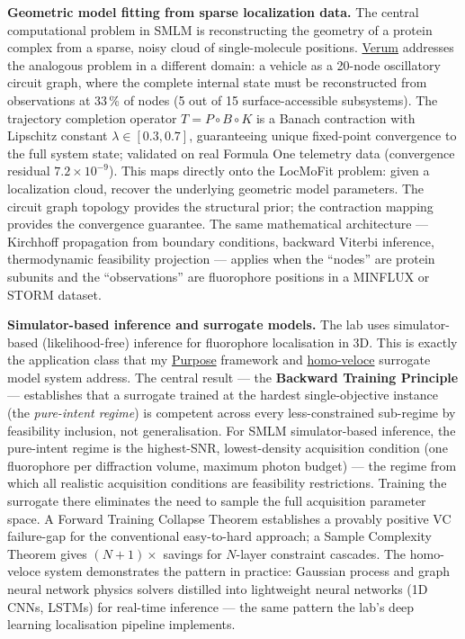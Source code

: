 \documentclass[12pt,a4paper]{article}
\begin{document}
\textbf{Geometric model fitting from sparse localization data.}
The central computational problem in SMLM is reconstructing the geometry of a
protein complex from a sparse, noisy cloud of single-molecule positions.
\href{https://github.com/fullscreen-triangle/verum}{Verum} addresses the analogous
problem in a different domain: a vehicle as a 20-node oscillatory circuit graph,
where the complete internal state must be reconstructed from observations at 33\,\%
of nodes (5 out of 15 surface-accessible subsystems). The trajectory completion
operator $T = P \circ B \circ K$ is a Banach contraction with Lipschitz constant
$\lambda \in [0.3, 0.7]$, guaranteeing unique fixed-point convergence to the full
system state; validated on real Formula One telemetry data (convergence residual
$7.2 \times 10^{-9}$).
This maps directly onto the LocMoFit problem: given a localization cloud, recover
the underlying geometric model parameters. The circuit graph topology provides
the structural prior; the contraction mapping provides the convergence guarantee.
The same mathematical architecture --- Kirchhoff propagation from boundary
conditions, backward Viterbi inference, thermodynamic feasibility projection ---
applies when the ``nodes'' are protein subunits and the ``observations'' are
fluorophore positions in a MINFLUX or STORM dataset.

\textbf{Simulator-based inference and surrogate models.}
The lab uses simulator-based (likelihood-free) inference for fluorophore
localisation in 3D. This is exactly the application class that my
\href{https://github.com/fullscreen-triangle/purpose}{Purpose} framework and
\href{https://github.com/fullscreen-triangle/homo-veloce}{homo-veloce} surrogate
model system address. The central result --- the \textbf{Backward Training Principle}
--- establishes that a surrogate trained at the hardest single-objective instance
(the \emph{pure-intent regime}) is competent across every less-constrained
sub-regime by feasibility inclusion, not generalisation. For SMLM simulator-based
inference, the pure-intent regime is the highest-SNR, lowest-density acquisition
condition (one fluorophore per diffraction volume, maximum photon budget) ---
the regime from which all realistic acquisition conditions are feasibility
restrictions. Training the surrogate there eliminates the need to sample the
full acquisition parameter space. A Forward Training Collapse Theorem establishes
a provably positive VC failure-gap for the conventional easy-to-hard approach;
a Sample Complexity Theorem gives $(N+1)\times$ savings for $N$-layer constraint
cascades. The homo-veloce system demonstrates the pattern in practice: Gaussian
process and graph neural network physics solvers distilled into lightweight neural
networks (1D CNNs, LSTMs) for real-time inference --- the same pattern the lab's
deep learning localisation pipeline implements.
\end{document}
